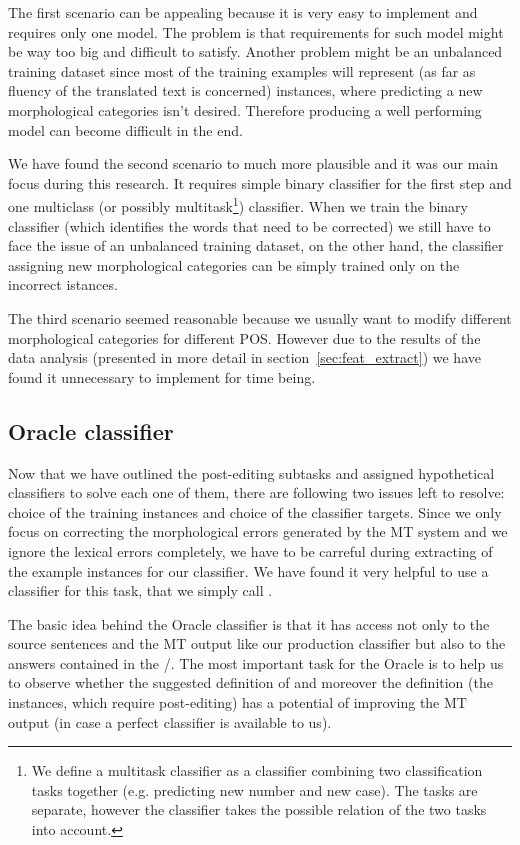 The first scenario can be appealing because it is very easy to implement and requires only one model.
The problem is that requirements for such model might be way too big and difficult to satisfy. Another
problem might be an unbalanced training dataset since most of the training examples will represent
 (as far as fluency of the translated text is concerned)
instances, where predicting a new morphological categories isn't desired. Therefore
producing a well performing model can become difficult in the end.

We have found the second scenario to much more plausible and it was our main focus during this research.
It requires simple binary classifier for the first step and one multiclass (or possibly multitask\footnote{We
define a multitask classifier as a classifier combining two classification tasks together (e.g. predicting new number and new case).
The tasks are separate, however the classifier takes the possible relation of the two tasks into account.}) classifier.
When we train the binary classifier (which identifies the words that need to be corrected) we still have to face
the issue of an unbalanced training dataset, on the other hand, the classifier assigning new morphological categories
can be simply trained only on the incorrect istances.

The third scenario seemed reasonable because we usually want to modify different morphological categories for different POS.
However due to the results of the data analysis (presented in more detail in section~\ref{sec:feat_extract}) we have found it unnecessary to implement for time being.

\subsection{Oracle classifier}

Now that we have outlined the post-editing subtasks and assigned hypothetical classifiers 
to solve each one of them, there are following two issues left to resolve: choice of the
training instances and choice of the classifier targets. Since we only focus on correcting the morphological
errors generated by the MT system and we ignore the lexical errors completely, we have to be carreful
during extracting of the example instances for our classifier. We have found it very helpful to
use a  classifier for this task, that we simply call .

The basic idea behind the Oracle classifier is that it has access not only to the
source sentences and the MT output like our production classifier but also to the  answers
contained in the /. The most important
task for the Oracle is to help us to observe whether the suggested definition of  and
moreover the definition  (the instances, which require post-editing)
has a potential of improving the MT output (in case a perfect classifier is available to us).

